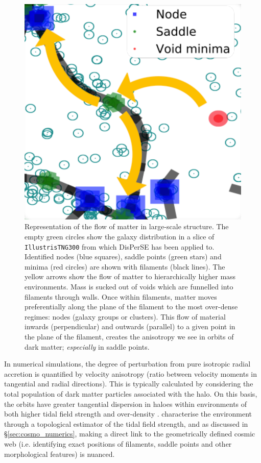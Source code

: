 \begin{figure}
    \centering
	\includegraphics[width=0.5\linewidth]{thesis/latex/dyn_mod_files/disperse_matter_path.pdf}
    \caption{Representation of the flow of matter in large-scale structure. The empty green circles show the galaxy distribution in a slice of \texttt{IllustrisTNG300} from which DisPerSE has been applied to. Identified nodes (blue squares), saddle points (green stars) and minima (red circles) are shown with filaments (black lines). The yellow arrows show the flow of matter to hierarchically higher mass environments. Mass is sucked out of voids which are funnelled into filaments through walls. Once within filaments, matter moves preferentially along the plane of the filament to the most over-dense regimes: nodes (galaxy groups or clusters). This flow of material inwards (perpendicular) and outwards (parallel) to a given point in the plane of the filament, creates the anisotropy we see in orbits of dark matter; \textit{especially} in saddle points.}
    \label{fig:disperse_matter_path}
\end{figure}

In numerical simulations, the degree of perturbation from pure isotropic radial accretion is quantified by velocity anisotropy (ratio between velocity moments in tangential and radial directions). This is typically calculated by considering the total population of dark matter particles associated with the halo. On this basis, the orbits have greater tangential dispersion in haloes within environments of both higher tidal field strength and over-density \citep[e.g.][]{faltenbacher2010, shi2015}. \citet{shi2015} characterise the environment through a topological estimator of the tidal field strength, and as discussed in \S\ref{sec:cosmo_numerics}, making a direct link to the geometrically defined cosmic web (i.e. identifying exact positions of filaments, saddle points and other morphological features) is nuanced.

